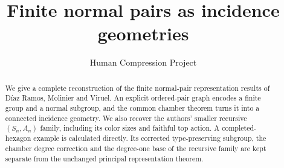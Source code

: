 
\title{Finite normal pairs as incidence geometries}
\author{Human Compression Project}
\date{}

\maketitle
\begin{abstract}
We give a complete reconstruction of the finite normal-pair representation
results of D\'iaz Ramos, Molinier and Viruel. An explicit ordered-pair graph
encodes a finite group and a normal subgroup, and the common chamber theorem
turns it into a connected incidence geometry. We also recover the authors'
smaller recursive $(S_n,A_n)$ family, including its color sizes and faithful
top action. A completed-hexagon example is calculated directly. Its corrected
type-preserving subgroup, the chamber degree correction and the degree-one
base of the recursive family are kept separate from the unchanged principal
representation theorem.
\end{abstract}





